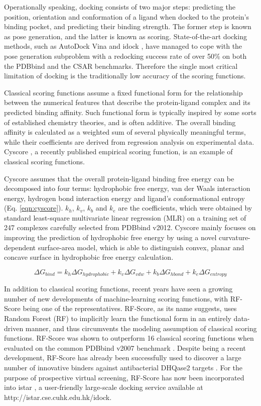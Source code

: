 \documentclass[journal=jacsat,manuscript=article]{achemso}
\begin{document}
Operationally speaking, docking consists of two major steps: predicting the position, orientation and conformation of a ligand when docked to the protein’s binding pocket, and predicting their binding strength. The former step is known as pose generation, and the latter is known as scoring. State-of-the-art docking methods, such as AutoDock Vina \cite{595} and idock \cite{1153}, have managed to cope with the pose generation subproblem with a redocking success rate of over 50\% \cite{1362} on both the PDBbind \cite{529,530} and the CSAR \cite{857,960} benchmarks. Therefore the single most critical limitation of docking is the traditionally low accuracy of the scoring functions.

Classical scoring functions assume a fixed functional form for the relationship between the numerical features that describe the protein-ligand complex and its predicted binding affinity. Such functional form is typically inspired by some sorts of established chemistry theories, and is often additive. The overall binding affinity is calculated as a weighted sum of several physically meaningful terms, while their coefficients are derived from regression analysis on experimental data. Cyscore \cite{1372}, a recently published empirical scoring function, is an example of classical scoring functions.

Cyscore assumes that the overall protein-ligand binding free energy can be decomposed into four terms: hydrophobic free energy, van der Waals interaction energy, hydrogen bond interaction energy and ligand's conformational entropy (Eq. \ref{eqn:cyscore}). $k_h$, $k_v$, $k_b$ and $k_e$ are the coefficients, which were obtained by standard least-square multivariate linear regression (MLR) on a training set of 247 complexes carefully selected from PDBbind v2012. Cyscore mainly focuses on improving the prediction of hydrophobic free energy by using a novel curvature-dependent surface-area model, which is able to distinguish convex, planar and concave surface in hydrophobic free energy calculation.

\begin{equation}
\Delta G_{bind} = k_h\Delta G_{hydrophobic} + k_v\Delta G_{vdw} + k_b\Delta G_{hbond} + k_e\Delta G_{entropy}
\label{eqn:cyscore}
\end{equation}

In addition to classical scoring functions, recent years have seen a growing number of new developments of machine-learning scoring functions, with RF-Score \cite{564} being one of the representatives. RF-Score, as its name suggests, uses Random Forest (RF) \cite{1309} to implicitly learn the functional form in an entirely data-driven manner, and thus circumvents the modeling assumption of classical scoring functions. RF-Score was shown to outperform 16 classical scoring functions when evaluated on the common PDBbind v2007 benchmark \cite{564}. Despite being a recent development, RF-Score has already been successfully used to discover a large number of innovative binders against antibacterial DHQase2 targets \cite{1281}. For the purpose of prospective virtual screening, RF-Score has now been incorporated into istar \cite{1362}, a user-friendly large-scale docking service available at http://istar.cse.cuhk.edu.hk/idock.
\end{document}

